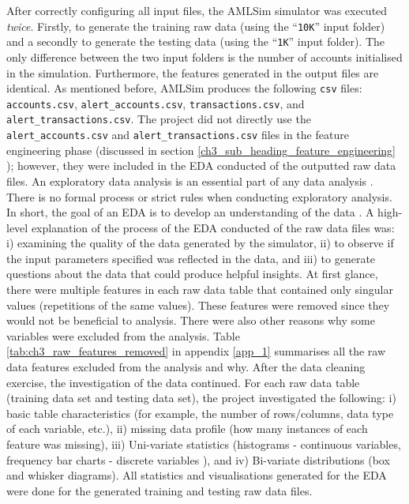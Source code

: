 After correctly configuring all input files, the AMLSim simulator was executed \textit{twice}. Firstly, to generate the training raw data (using the ``\texttt{10K}'' input folder) and a secondly to generate the testing data (using the ``\texttt{1K}'' input folder). The only difference between the two input folders is the number of accounts initialised in the simulation. Furthermore, the features generated in the output files are identical. As mentioned before, AMLSim produces the following \texttt{csv} files: \texttt{accounts.csv}, \texttt{alert\_accounts.csv}, \texttt{transactions.csv}, and \texttt{alert\_transactions.csv}. The  project did not directly use the \texttt{alert\_accounts.csv} and \texttt{alert\_transactions.csv} files in the feature engineering phase (discussed in section \ref{ch3_sub_heading_feature_engineering} ); however, they were included in the EDA conducted of the outputted raw data files. An exploratory data analysis is an essential part of any data analysis \citep*{wickham2016r}. There is no formal process or strict rules when conducting exploratory analysis. In short, the goal of an EDA is to develop an understanding of the data \citep{wickham2016r}. A high-level explanation of the process of the EDA conducted of the raw data files was: i) examining the quality of the data generated by the simulator, ii) to observe if the input parameters specified was reflected in the data, and iii) to generate questions about the data that could produce helpful insights. At first glance, there were multiple features in each raw data table that contained only singular values (repetitions of the same values). These features were removed since they would not be beneficial to analysis. There were also other reasons why some variables were excluded from the analysis. Table \ref{tab:ch3_raw_features_removed} in appendix \ref{app_1} summarises all the raw data features excluded from the analysis and why. After the data cleaning exercise, the investigation of the data continued. For each raw data table (training data set and testing data set), the project investigated the following: i) basic table characteristics (for example, the number of rows/columns, data type of each variable, etc.), ii) missing data profile (how many instances of each feature was missing), iii) Uni-variate statistics (histograms - continuous variables, frequency bar charts - discrete variables ), and iv) Bi-variate distributions (box and whisker diagrams). All statistics and visualisations generated for the EDA were done for the generated training and testing raw data files. 

